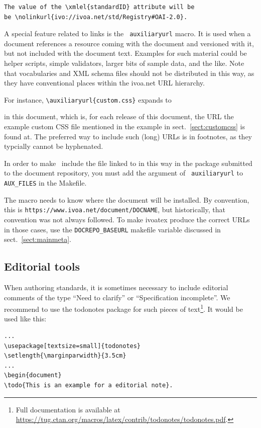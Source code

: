 \documentclass[11pt,a4paper]{ivoa}
\newcommand{\texword}[1]{\texttt{\color{texcolor} #1}}
\begin{document}
\begin{lstlisting}
The value of the \xmlel{standardID} attribute will be
be \nolinkurl{ivo://ivoa.net/std/Registry#OAI-2.0}.
\end{lstlisting}

A special feature related to links is the \texword{auxiliaryurl} macro.
It is used when a document references a resource coming with the
document and versioned with it, but not included with the document text.
Examples for such material could be helper scripts, simple validators,
larger bits of sample data, and the like.  Note that vocabularies and
XML schema files should not be distributed in this way, as they have
conventional places within the ivoa.net URL hierarchy.

For instance, \verb|\auxiliaryurl{custom.css}| expands to
\begin{center}
\end{center}
\noindent in this document,
which is, for each release of this
document, the URL the example custom CSS file mentioned in the example
in sect.~\ref{sect:customcss} is found at.  The preferred way to include
such (long) URLs is in footnotes, as they typcially cannot be hyphenated.

In order to make \ivoatex~include the file linked to in this way in the
package submitted to the document repository, you must add the argument
of \texword{auxiliaryurl} to \verb|AUX_FILES| in the Makefile.

The macro needs to know where the document will be installed.  By
convention, this is \nolinkurl{https://www.ivoa.net/document/DOCNAME},
but historically, that convention was not always followed.  To make
ivoatex produce the correct URLs in those cases, use the
\verb|DOCREPO_BASEURL| makefile variable discussed in
sect.~\ref{sect:mainmeta}.

\subsection{Editorial tools}

When authoring standards, it is sometimes necessary to include
editorial comments of the type ``Need to clarify'' or ``Specification
incomplete''.  We recommend to use the todonotes package for such
pieces of text\footnote{Full documentation is available at
\url{https://tug.ctan.org/macros/latex/contrib/todonotes/todonotes.pdf}.}.
It would be used like this:
\begin{lstlisting}
...
\usepackage[textsize=small]{todonotes}
\setlength{\marginparwidth}{3.5cm}
...
\begin{document}
\todo{This is an example for a editorial note}.
\end{lstlisting}
\end{document}
